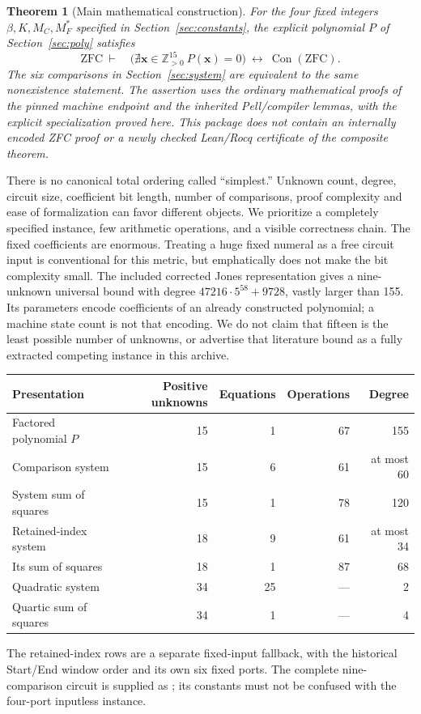 \documentclass[11pt]{article}
\newcommand{\Pos}{\mathbb Z_{>0}}
\newcommand{\Con}{\operatorname{Con}}
\newtheorem{theorem}{Theorem}
\begin{document}
\begin{theorem}[Main mathematical construction]\label{thm:main}
For the four fixed integers \(\beta,K,M_C,M_F^*\) specified in Section~\ref{sec:constants}, the explicit polynomial \(P\) of Section~\ref{sec:poly} satisfies
\[
\mathrm{ZFC}\ \vdash\quad
\bigl(\nexists\mathbf x\in\Pos^{15}\ P(\mathbf x)=0\bigr)
\ \longleftrightarrow\ \Con(\mathrm{ZFC}).
\]
The six comparisons in Section~\ref{sec:system} are equivalent to the same nonexistence statement. The assertion uses the ordinary mathematical proofs of the pinned machine endpoint and the inherited Pell/compiler lemmas, with the explicit specialization proved here. This package does not contain an internally encoded ZFC proof or a newly checked Lean/Rocq certificate of the composite theorem.
\end{theorem}

There is no canonical total ordering called ``simplest.'' Unknown count, degree, circuit size, coefficient bit length, number of comparisons, proof complexity and ease of formalization can favor different objects. We prioritize a completely specified instance, few arithmetic operations, and a visible correctness chain. The fixed coefficients are enormous. Treating a huge fixed numeral as a free circuit input is conventional for this metric, but emphatically does not make the bit complexity small. The included corrected Jones representation gives a nine-unknown universal bound with degree \(47216\cdot5^{58}+9728\), vastly larger than 155. Its parameters encode coefficients of an already constructed polynomial; a machine state count is not that encoding. We do not claim that fifteen is the least possible number of unknowns, or advertise that literature bound as a fully extracted competing instance in this archive.

\begin{center}
\begin{tabular}{@{}lrrrr@{}}
\toprule
Presentation & Positive unknowns & Equations & Operations & Degree\\
\midrule
Factored polynomial \(P\) & 15 & 1 & 67 & 155\\
Comparison system & 15 & 6 & 61 & at most 60\\
System sum of squares & 15 & 1 & 78 & 120\\
Retained-index system & 18 & 9 & 61 & at most 34\\
Its sum of squares & 18 & 1 & 87 & 68\\
Quadratic system & 34 & 25 & --- & 2\\
Quartic sum of squares & 34 & 1 & --- & 4\\
\bottomrule
\end{tabular}
\end{center}
The retained-index rows are a separate fixed-input fallback, with the historical Start/End window order and its own six fixed ports. The complete nine-comparison circuit is supplied as ; its constants must not be confused with the four-port inputless instance.
\end{document}
